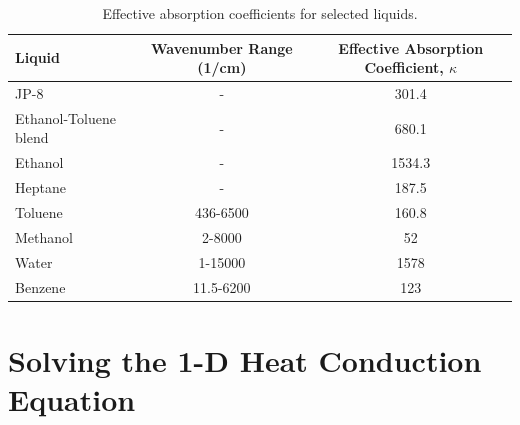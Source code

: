 \begin{table}[ht]
\caption[Effective absorption coefficients for selected liquids]{Effective absorption coefficients for selected liquids.}
\centering
\begin{tabular}{l c c}
\hline\hline
Liquid                                              & Wavenumber Range (\si{1/\cm})  & Effective Absorption Coefficient, $\kappa$    \\ \hline
JP-8 \cite{Suo-Anttila:PCT2009}                     &  -                             & 301.4                                         \\
Ethanol-Toluene blend \cite{Suo-Anttila:PCT2009}    &  -                             & 680.1                                         \\
Ethanol \cite{Suo-Anttila:PCT2009}                  &  -                             & 1534.3                                        \\
Heptane \cite{Suo-Anttila:PCT2009}                  &  -                             & 187.5                                         \\
Toluene \cite{Bertie:AS1994a}                       &  436-6500                      & 160.8                                         \\
Methanol\cite{Bertie:AS1993a}                       &  2-8000                        & 52                                            \\
Water   \cite{Bertie:AS1996}                        &  1-15000                       & 1578                                          \\
Benzene \cite{Bertie:AS1993b}                       &  11.5-6200                     & 123                                           \\ \hline
\end{tabular}
\label{tbl_abscoeff}
\end{table}




\chapter{Solving the 1-D Heat Conduction Equation}
\label{solid-phase-discretization}


